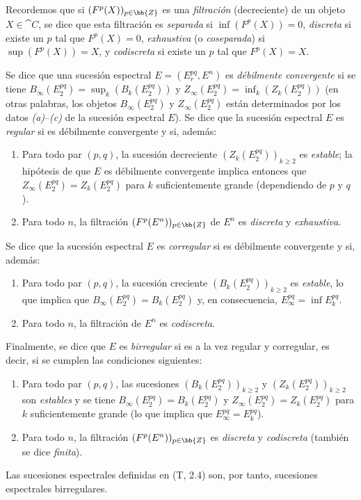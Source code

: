 \documentclass[oneside]{amsart}
\renewcommand{\geq}{\geqslant}
\newcommand{\oldpage}[2][]{{\marginnote{\normalfont\textbf{#1}~|~#2}}\ignorespaces}
\let\EGAOriginalLabel\label
\renewcommand{\label}[1]{\phantomsection\EGAOriginalLabel{#1}}
\begin{document}
\begin{env}[11.1.3]
\label{0.11.1.3}
\oldpage[0\textsubscript{III}]{25}
Recordemos que si $(F^p(X))_{p\in\bb{Z}}$ es una \emph{filtración} (decreciente) de un objeto $X\in\cat{C}$, se dice que esta filtración es \emph{separada} si $\inf(F^p(X))=0$, \emph{discreta} si existe un $p$ tal que $F^p(X)=0$, \emph{exhaustiva} (o \emph{coseparada}) si $\sup(F^p(X))=X$, y \emph{codiscreta} si existe un $p$ tal que $F^p(X)=X$.

Se dice que una sucesión espectral $E=(E_r^{pq},E^n)$ es \emph{débilmente convergente} si se tiene $B_\infty(E_2^{pq})=\sup_k(B_k(E_2^{pq}))$ y $Z_\infty(E_2^{pq})=\inf_k(Z_k(E_2^{pq}))$ (en otras palabras, los objetos $B_\infty(E_2^{pq})$ y $Z_\infty(E_2^{pq})$ están determinados por los datos \emph{(a)}--\emph{(c)} de la sucesión espectral $E$).
Se dice que la sucesión espectral $E$ es \emph{regular} si es débilmente convergente y si, además:
\begin{enumerate}
  \item[$1^\circ$] Para todo par $(p,q)$, la sucesión decreciente $(Z_k(E_2^{pq}))_{k\geq 2}$ es \emph{estable}; la hipótesis de que $E$ es débilmente convergente implica entonces que $Z_\infty(E_2^{pq})=Z_k(E_2^{pq})$ para $k$ suficientemente grande (dependiendo de $p$ y $q$).
  \item[$2^\circ$] Para todo $n$, la filtración $(F^p(E^n))_{p\in\bb{Z}}$ de $E^n$ es \emph{discreta} y \emph{exhaustiva}.
\end{enumerate}

Se dice que la sucesión espectral $E$ es \emph{corregular} si es débilmente convergente y si, además:
\begin{enumerate}
  \item[$3^\circ$] Para todo par $(p,q)$, la sucesión creciente $(B_k(E_2^{pq}))_{k\geq 2}$ es \emph{estable}, lo que implica que $B_\infty(E_2^{pq})=B_k(E_2^{pq})$ y, en consecuencia, $E_\infty^{pq}=\inf E_k^{pq}$.
  \item[$4^\circ$] Para todo $n$, la filtración de $E^n$ es \emph{codiscreta}.
\end{enumerate}

Finalmente, se dice que $E$ es \emph{birregular} si es a la vez regular y corregular, es decir, si se cumplen las condiciones siguientes:
\begin{enumerate}
  \item[\textit{(a)}] Para todo par $(p,q)$, las sucesiones $(B_k(E_2^{pq}))_{k\geq 2}$ y $(Z_k(E_2^{pq}))_{k\geq 2}$ son \emph{estables} y se tiene $B_\infty(E_2^{pq})=B_k(E_2^{pq})$ y $Z_\infty(E_2^{pq})=Z_k(E_2^{pq})$ para $k$ suficientemente grande (lo que implica que $E_\infty^{pq}=E_k^{pq}$).
  \item[\textit{(b)}] Para todo $n$, la filtración $(F^p(E^n))_{p\in\bb{Z}}$ es \emph{discreta} y \emph{codiscreta} (también se dice \emph{finita}).
\end{enumerate}

Las sucesiones espectrales definidas en (T, 2.4) son, por tanto, sucesiones espectrales birregulares.
\end{env}
\end{document}
